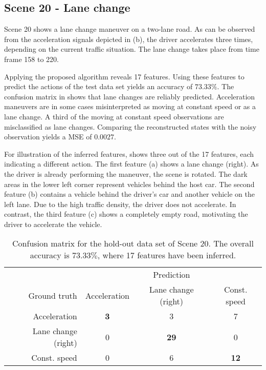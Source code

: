 \documentclass{article}
\begin{document}
\subsection{Scene 20 - Lane change}
\label{sec::res::real::0020}
Scene 20 shows a lane change maneuver on a two-lane road.
As can be observed from the acceleration signals depicted in (b), the driver accelerates three times, depending on the current traffic situation.
The lane change takes place from time frame 158 to 220.

Applying the proposed algorithm reveals 17 features. Using these features to predict the actions of the test data set yields an accuracy of $73.33\%$. The confusion matrix in  shows that lane changes are reliably predicted.
Acceleration maneuvers are in some cases misinterpreted as moving at constant speed or as a lane change.
A third of the moving at constant speed observations are misclassified as lane changes.
Comparing the reconstructed states with the noisy observation yields a \ac{MSE} of $0.0027$.

For illustration of the inferred features,  shows three out of the 17 features, each indicating a different action. The first feature (a) shows a lane change (right). 
As the driver is already performing the maneuver, the scene is rotated. The dark areas in the lower left corner represent vehicles behind the host car. 
The second feature (b) contains a vehicle behind the driver's car and another vehicle on the left lane. Due to the high traffic density, the driver does not accelerate.
In contrast, the third feature (c) shows a completely empty road, motivating the driver to accelerate the vehicle.





\begin{table}
 \centering
 \caption{Confusion matrix for the hold-out data set of Scene 20. The overall accuracy is $73.33\%$, where 17 features have been inferred. }
 \begin{tabular}{r||ccc}
       & \multicolumn{3}{c}{Prediction}
   \\ Ground truth  & Acceleration  & Lane change (right) & Const. speed
   \\ \hline \hline
      Acceleration        & \bf 3 & 3 & 7
   \\ Lane change (right) & 0  & \bf 29 & 0
   \\ Const. speed              & 0  & 6 & \bf 12
 \end{tabular}
 \label{tab::res::real::conf::0020}
\end{table}
\end{document}
